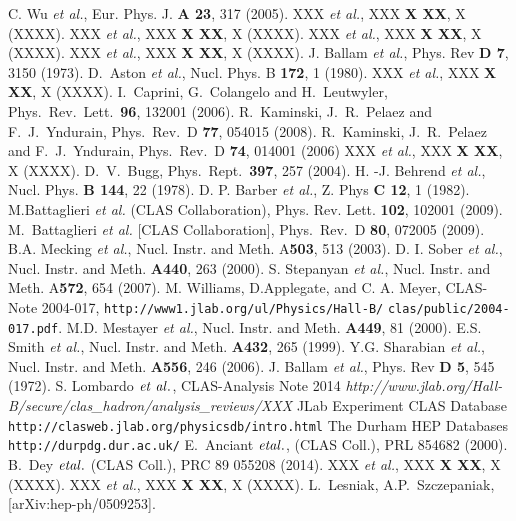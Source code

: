 \documentclass[twocolumn,superscriptaddress,prd]{revtex4}
\begin{document}
\newpage

\begin{thebibliography}{99}
  
 C. Wu \textit{et al.}, Eur. Phys. J. \textbf{A 23}, 317 (2005).
 XXX \textit{et al.}, XXX \textbf{X XX}, X (XXXX).
 XXX \textit{et al.}, XXX  \textbf{X XX}, X (XXXX).
 XXX \textit{et al.}, XXX  \textbf{X XX}, X (XXXX).
 XXX \textit{et al.}, XXX  \textbf{X XX}, X (XXXX).
 J. Ballam \textit{et al.}, Phys. Rev \textbf{D 7}, 3150 (1973).
 D.~Aston {\it et al.}, Nucl. Phys. B {\bf 172}, 1 (1980).
 XXX \textit{et al.}, XXX  \textbf{X XX}, X (XXXX).
   I.~Caprini, G.~Colangelo and H.~Leutwyler,  Phys.\ Rev.\ Lett.\  {\bf 96}, 132001 (2006).
  R.~Kaminski, J.~R.~Pelaez and F.~J.~Yndurain,  Phys.\ Rev.\  D {\bf 77}, 054015 (2008).
   R.~Kaminski, J.~R.~Pelaez and F.~J.~Yndurain,  Phys.\ Rev.\  D {\bf 74}, 014001 (2006)
 XXX \textit{et al.}, XXX  \textbf{X XX}, X (XXXX).
  D.~V.~Bugg,  Phys.\ Rept.\  {\bf 397}, 257 (2004).
 H. -J. Behrend \textit{et al.}, Nucl. Phys. \textbf{B 144}, 22 (1978).
 D. P. Barber \textit{et al.}, Z. Phys \textbf{C 12}, 1 (1982).
 M.Battaglieri \textit{et al.} (CLAS Collaboration), Phys. Rev. Lett.  \textbf{102}, 102001 (2009).
 M.~Battaglieri {\it et al.}  [CLAS Collaboration], Phys.\ Rev.\  D {\bf 80}, 072005 (2009).
 B.A. Mecking {\it et al.}, Nucl. Instr. and Meth. A{\bf 503}, 513  (2003).
  D. I. Sober {\it et al.}, Nucl. Instr. and Meth. {\bf A440}, 263  (2000).
 S. Stepanyan {\it et al.}, Nucl. Instr. and Meth. A{\bf 572}, 654  (2007).
 M. Williams, D.Applegate, and C. A. Meyer,   CLAS-Note 2004-017,
\texttt{http://www1.jlab.org/ul/Physics/Hall-B/}
\texttt{clas/public/2004-017.pdf}.
    M.D. Mestayer    {\it et al.}, Nucl. Instr. and Meth. {\bf A449}, 81 (2000).
  E.S. Smith {\it et al.}, Nucl. Instr. and Meth. {\bf A432}, 265  (1999).
 Y.G. Sharabian {\it et al.}, Nucl. Instr. and Meth. {\bf A556}, 246  (2006).
 J. Ballam \textit{et al.}, Phys. Rev \textbf{D 5}, 545 (1972).
 S. Lombardo $\it{et \ al.}$,  CLAS-Analysis Note 2014  {\em http://www.jlab.org/Hall-B/secure/clas\_hadron/analysis\_reviews/XXX}
 JLab Experiment CLAS Database \texttt{http://clasweb.jlab.org/physicsdb/intro.html}
 The Durham HEP Databases \texttt{http://durpdg.dur.ac.uk/}
   E.~Anciant $\it{et al.}$, (CLAS Coll.), PRL 854682 (2000).
 B.~Dey $\it{et al.}$ (CLAS Coll.), PRC 89 055208 (2014).
 XXX \textit{et al.}, XXX  \textbf{X XX}, X (XXXX).
 XXX \textit{et al.}, XXX  \textbf{X XX}, X (XXXX).
 L.~Lesniak, A.P.~Szczepaniak, [arXiv:hep-ph/0509253].







\end{thebibliography}
\end{document}
